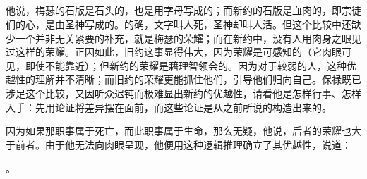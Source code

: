 
\subsection{}

\par

\par

他说，梅瑟的石版是石头的，也是用字母写成的；而新约的石版是血肉的，即宗徒们的心，是由圣神写成的。的确，文字叫人死，圣神却叫人活。但这个比较中还缺少一个并非无关紧要的补充，就是梅瑟的荣耀；而在新约中，没有人用肉身之眼见过这样的荣耀。正因如此，旧约这事显得伟大，因为荣耀是可感知的（它肉眼可见，即使不能靠近）；但新约的荣耀是藉理智领会的。因为对于较弱的人，这种优越性的理解并不清晰；而旧约的荣耀更能抓住他们，引导他们归向自己。保禄既已涉足这个比较，又因听众迟钝而极难显出新约的优越性，请看他是怎样行事、怎样入手：先用论证将差异摆在面前，而这些论证是从之前所说的构造出来的。\par

因为如果那职事属于死亡，而此职事属于生命，那么无疑，他说，后者的荣耀也大于前者。由于他无法向肉眼呈现，他便用这种逻辑推理确立了其优越性，说道：\par

。\par

